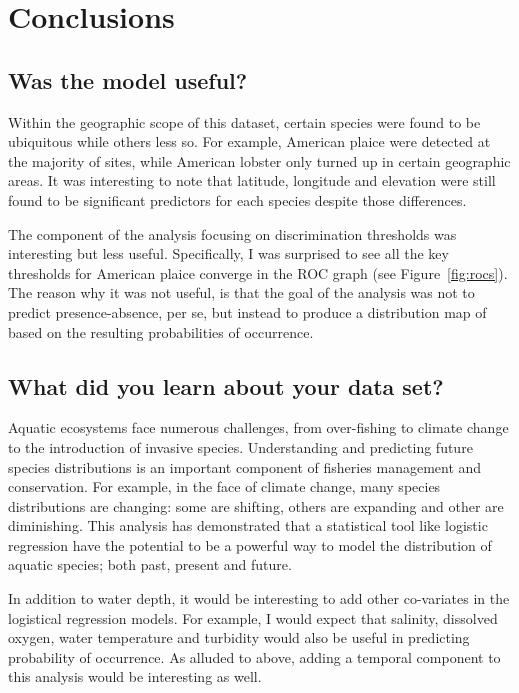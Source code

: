 \section{Conclusions}

\subsection{Was the model useful?}

Within the geographic scope of this dataset, certain species were found to be ubiquitous while others less so.
For example, American plaice were detected at the majority of sites, while American lobster only turned up in certain
geographic areas.
It was interesting to note that latitude, longitude and elevation were still found to be significant predictors for each
species despite those differences.

The component of the analysis focusing on discrimination thresholds was interesting but less useful.
Specifically, I was surprised to see all the key thresholds for American plaice converge in the ROC graph (see Figure~\ref{fig:rocs}).
The reason why it was not useful, is that the goal of the analysis was not to predict presence-absence, per se, but instead
to produce a distribution map of based on the resulting probabilities of occurrence.


\subsection{What did you learn about your data set?}

Aquatic ecosystems face numerous challenges, from over-fishing to climate change to the introduction of invasive species.
Understanding and predicting future species distributions is an important component of fisheries management and conservation.
For example, in the face of climate change, many species distributions are changing: some are shifting, others are expanding
and other are diminishing.
This analysis has demonstrated that a statistical tool like logistic regression have the potential to be a powerful
way to model the distribution of aquatic species; both past, present and future.

In addition to water depth, it would be interesting to add other co-variates in the logistical regression models.
For example, I would expect that salinity, dissolved oxygen, water temperature and turbidity would also be useful in predicting
probability of occurrence.
As alluded to above, adding a temporal component to this analysis would be interesting as well.

